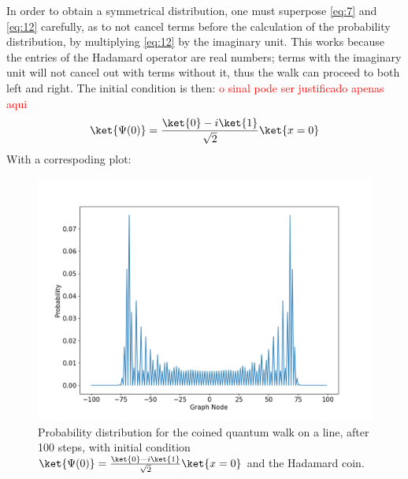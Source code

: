                 In order to obtain a symmetrical distribution, one must superpose \ref{eq:7} and \ref{eq:12} carefully, as to not cancel terms before the calculation of the probability distribution, by multiplying \ref{eq:12} by the imaginary unit. This works because the entries of the Hadamard operator are real numbers; terms with the imaginary unit will not cancel out with terms without it, thus the walk can proceed to both left and right. The initial condition is then: \textcolor{red}{o sinal pode ser justificado apenas aqui}
                \begin{equation}
                    \ket{\Psi(0)} = \frac{\ket{0}-i\ket{1}}{\sqrt{2}}\ket{x=0}
                    \label{eq:12}
                \end{equation}
                With a correspoding plot:
    	        \begin{figure}[!ht]
                    \centering
                    \includegraphics[scale=0.40]{img/CoinedQuantumWalk/Coinedpsi001.png}
                    \caption{Probability distribution for the coined quantum walk on a line, after 100 steps, with initial condition $\ket{\Psi(0)}=\frac{\ket{0}-i\ket{1}}{\sqrt{2}}\ket{x=0}$ and the Hadamard coin.} 
                    \label{fig:coinedwalk3}
                \end{figure}
                
                

